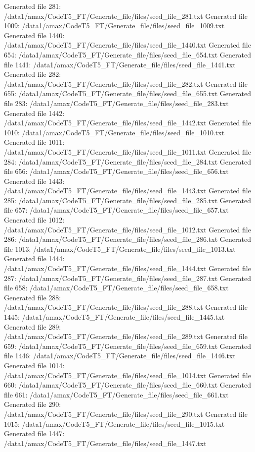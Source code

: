Generated file 281: /data1/amax/CodeT5_FT/Generate_file/files/seed_file_281.txt
Generated file 1009: /data1/amax/CodeT5_FT/Generate_file/files/seed_file_1009.txt
Generated file 1440: /data1/amax/CodeT5_FT/Generate_file/files/seed_file_1440.txt
Generated file 654: /data1/amax/CodeT5_FT/Generate_file/files/seed_file_654.txt
Generated file 1441: /data1/amax/CodeT5_FT/Generate_file/files/seed_file_1441.txt
Generated file 282: /data1/amax/CodeT5_FT/Generate_file/files/seed_file_282.txt
Generated file 655: /data1/amax/CodeT5_FT/Generate_file/files/seed_file_655.txt
Generated file 283: /data1/amax/CodeT5_FT/Generate_file/files/seed_file_283.txt
Generated file 1442: /data1/amax/CodeT5_FT/Generate_file/files/seed_file_1442.txt
Generated file 1010: /data1/amax/CodeT5_FT/Generate_file/files/seed_file_1010.txt
Generated file 1011: /data1/amax/CodeT5_FT/Generate_file/files/seed_file_1011.txt
Generated file 284: /data1/amax/CodeT5_FT/Generate_file/files/seed_file_284.txt
Generated file 656: /data1/amax/CodeT5_FT/Generate_file/files/seed_file_656.txt
Generated file 1443: /data1/amax/CodeT5_FT/Generate_file/files/seed_file_1443.txt
Generated file 285: /data1/amax/CodeT5_FT/Generate_file/files/seed_file_285.txt
Generated file 657: /data1/amax/CodeT5_FT/Generate_file/files/seed_file_657.txt
Generated file 1012: /data1/amax/CodeT5_FT/Generate_file/files/seed_file_1012.txt
Generated file 286: /data1/amax/CodeT5_FT/Generate_file/files/seed_file_286.txt
Generated file 1013: /data1/amax/CodeT5_FT/Generate_file/files/seed_file_1013.txt
Generated file 1444: /data1/amax/CodeT5_FT/Generate_file/files/seed_file_1444.txt
Generated file 287: /data1/amax/CodeT5_FT/Generate_file/files/seed_file_287.txt
Generated file 658: /data1/amax/CodeT5_FT/Generate_file/files/seed_file_658.txt
Generated file 288: /data1/amax/CodeT5_FT/Generate_file/files/seed_file_288.txt
Generated file 1445: /data1/amax/CodeT5_FT/Generate_file/files/seed_file_1445.txt
Generated file 289: /data1/amax/CodeT5_FT/Generate_file/files/seed_file_289.txt
Generated file 659: /data1/amax/CodeT5_FT/Generate_file/files/seed_file_659.txt
Generated file 1446: /data1/amax/CodeT5_FT/Generate_file/files/seed_file_1446.txt
Generated file 1014: /data1/amax/CodeT5_FT/Generate_file/files/seed_file_1014.txt
Generated file 660: /data1/amax/CodeT5_FT/Generate_file/files/seed_file_660.txt
Generated file 661: /data1/amax/CodeT5_FT/Generate_file/files/seed_file_661.txt
Generated file 290: /data1/amax/CodeT5_FT/Generate_file/files/seed_file_290.txt
Generated file 1015: /data1/amax/CodeT5_FT/Generate_file/files/seed_file_1015.txt
Generated file 1447: /data1/amax/CodeT5_FT/Generate_file/files/seed_file_1447.txt
